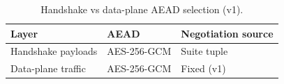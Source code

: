 \begin{table}[!t]
\centering
\footnotesize
\caption{Handshake vs data-plane AEAD selection (v1).}
\label{tab:aead-mapping}
\begin{tabular}{@{}lll@{}}
\toprule
Layer & AEAD & Negotiation source \\
\midrule
Handshake payloads & AES-256-GCM & Suite tuple \\
Data-plane traffic & AES-256-GCM & Fixed (v1) \\
\bottomrule
\end{tabular}
\end{table}

